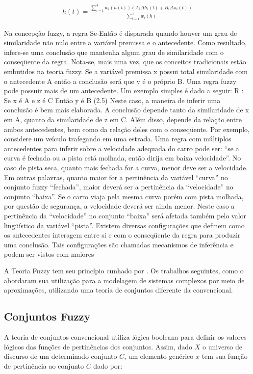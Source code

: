 	\begin{align}
		\dot{h}(t) = \frac{\sum_{i=1}^{4}  w_i(h(t))(A_i \Delta h_i(t) +  B_i \Delta u_i(t))}{\sum_{i=1}^{4} w_i(h)}
	\end{align}

Na concepção fuzzy, a regra Se-Então é disparada quando houver um grau de similaridade
não nulo entre a variável premissa e o antecedente. Como resultado, infere-se uma conclusão
que mantenha algum grau de similaridade com o conseqüente da regra. Nota-se, mais uma
vez, que os conceitos tradicionais estão embutidos na teoria fuzzy. Se a variável premissa x
possui total similaridade com o antecedente A então a conclusão será que y é o próprio B.
Uma regra fuzzy pode possuir mais de um antecedente. Um exemplo simples é dado a
seguir:
R :
Se x é A e z é C
Então y é B
(2.5)
Neste caso, a maneira de inferir uma conclusão é bem mais elaborada. A conclusão depende
tanto da similaridade de x em A, quanto da similaridade de z em C. Além disso, depende da
relação entre ambos antecedentes, bem como da relação deles com o conseqüente.
Por exemplo, considere um veículo trafegando em uma estrada. Uma regra com múltiplos
antecedentes para inferir sobre a velocidade adequada do carro pode ser: “se a curva é fechada
ou a pista está molhada, então dirija em baixa velocidade”.
No caso de pista seca, quanto mais fechada for a curva, menor deve ser a velocidade.
Em outras palavras, quanto maior for a pertinência da variável “curva” no conjunto fuzzy
“fechada”, maior deverá ser a pertinência da “velocidade” no conjunto “baixa”.
Se o carro viaja pela mesma curva porém com pista molhada, por questão de segurança,
a velocidade deverá ser ainda menor. Neste caso a pertinência da “velocidade” no conjunto
“baixa” será afetada também pelo valor lingüístico da variável “pista”.
Existem diversas configurações que definem como os antecedentes interagem entre si e
com o conseqüente da regra para produzir uma conclusão. Tais configurações são chamadas
mecanismos de inferência e podem ser vistos com maiores

\indent A Teoria Fuzzy tem seu princípio cunhado por \cite{zadeh65}. Os trabalhos seguintes, como o \cite{takagi_sugeno} abordaram sua utilização para a modelagem de sistemas complexos por meio de aproximações, utilizando uma teoria de conjuntos diferente da convencional.

\subsection{Conjuntos Fuzzy}
\indent A teoria de conjuntos convencional utiliza lógica booleana para definir os valores lógicos das funções de pertinências dos conjuntos. Assim, dado $X$ o universo de discurso de um determinado conjunto $C$, um elemento genérico $x$ tem sua função de pertinência ao conjunto $C$ dado por:

